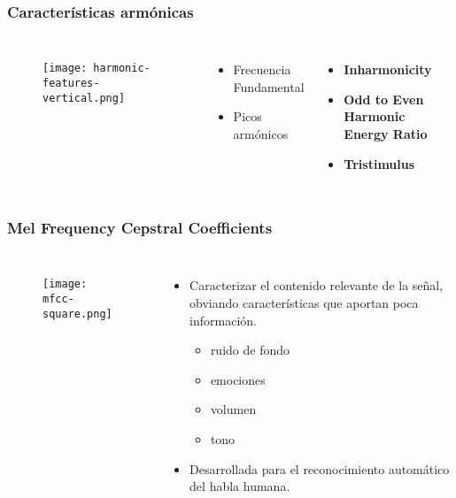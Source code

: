 \begin{frame}
    \frametitle{Características armónicas}

    \begin{columns}

        \begin{figure}[!h]
            \centering
            \texttt{[image: harmonic-features-vertical.png]}
        \end{figure}


        \begin{itemize}
            \item Frecuencia Fundamental
            \item Picos armónicos
        \end{itemize}

        \begin{itemize}
            \item<2-> \textbf{Inharmonicity}
            \item<3-> \textbf{Odd to Even Harmonic Energy Ratio}
            \item<4-> \textbf{Tristimulus}
        \end{itemize}

    \end{columns}
\end{frame}

\begin{frame}
    \frametitle{Mel Frequency Cepstral Coefficients}

    \begin{columns}

        \begin{figure}[!h]
            \centering
            \texttt{[image: mfcc-square.png]}
        \end{figure}

        \pause

        \begin{itemize}
            \item<2-> Caracterizar el contenido relevante de la señal, obviando características que aportan poca información.
            \begin{itemize}
                \item<3-> ruido de fondo
                \item<3-> emociones
                \item<3-> volumen
                \item<3-> tono
            \end{itemize}
            \item<4-> Desarrollada para el reconocimiento automático del habla humana.
        \end{itemize}

    \end{columns}
\end{frame}


